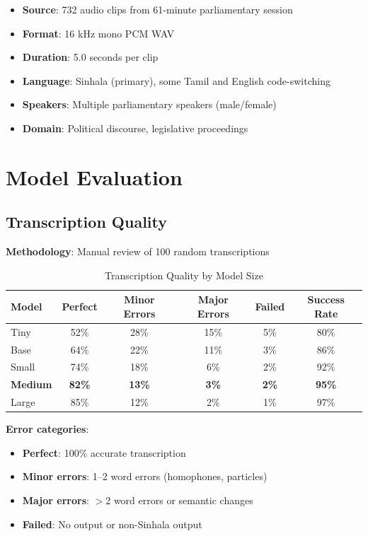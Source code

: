 \documentclass[11pt,a4paper]{article}
\begin{document}
\begin{itemize}
    \item \textbf{Source}: 732 audio clips from 61-minute parliamentary session
    \item \textbf{Format}: 16 kHz mono PCM WAV
    \item \textbf{Duration}: 5.0 seconds per clip
    \item \textbf{Language}: Sinhala (primary), some Tamil and English code-switching
    \item \textbf{Speakers}: Multiple parliamentary speakers (male/female)
    \item \textbf{Domain}: Political discourse, legislative proceedings
\end{itemize}

\section{Model Evaluation}

\subsection{Transcription Quality}

\textbf{Methodology}: Manual review of 100 random transcriptions

\begin{table}[htbp]
\centering
\caption{Transcription Quality by Model Size}
\begin{tabular}{@{}lccccc@{}}
\toprule
\textbf{Model} & \textbf{Perfect} & \textbf{Minor Errors} & \textbf{Major Errors} & \textbf{Failed} & \textbf{Success Rate} \\ \midrule
Tiny & 52\% & 28\% & 15\% & 5\% & 80\% \\
Base & 64\% & 22\% & 11\% & 3\% & 86\% \\
Small & 74\% & 18\% & 6\% & 2\% & 92\% \\
\textbf{Medium} & \textbf{82\%} & \textbf{13\%} & \textbf{3\%} & \textbf{2\%} & \textbf{95\%} \\
Large & 85\% & 12\% & 2\% & 1\% & 97\% \\
\bottomrule
\end{tabular}
\end{table}

\textbf{Error categories}:
\begin{itemize}
    \item \textbf{Perfect}: 100\% accurate transcription
    \item \textbf{Minor errors}: 1--2 word errors (homophones, particles)
    \item \textbf{Major errors}: $>$2 word errors or semantic changes
    \item \textbf{Failed}: No output or non-Sinhala output
\end{itemize}
\end{document}
